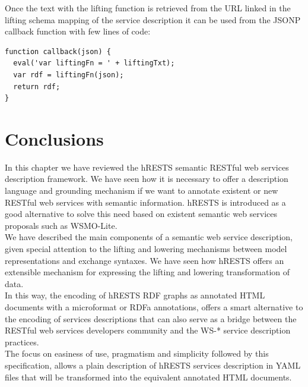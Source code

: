 Once the text with the lifting function is retrieved from the URL linked in the lifting schema mapping of the service description it can be used from the JSONP callback function with few lines of code:
\vspace{5 mm}
\begin{lstlisting}
function callback(json) {
  eval('var liftingFn = ' + liftingTxt);
  var rdf = liftingFn(json);
  return rdf;
}
\end{lstlisting}
\vspace{5 mm}

\section{Conclusions}
In this chapter we have reviewed the hRESTS semantic RESTful web services description framework. We have seen how it is necessary to offer a description language and grounding mechanism if we want to annotate existent or new RESTful web services with semantic information. hRESTS is introduced as a good alternative to solve this need based on existent semantic web services proposals such as WSMO-Lite.\\
We have described the main components of a semantic web service description, given special attention to the lifting and lowering mechanisms between model representations and exchange syntaxes. We have seen how hRESTS offers an extensible mechanism for expressing the lifting and lowering transformation of data.\\
In this way, the encoding of hRESTS RDF graphs as annotated HTML documents with a microformat or RDFa annotations, offers a smart alternative to the encoding of services descriptions that can also serve as a bridge between the RESTful web services developers community and the WS-* service description practices.\\
The focus on easiness of use, pragmatism and simplicity followed by this specification, allows a plain description of hRESTS services description in YAML files that will be transformed into the equivalent annotated HTML documents.\\

